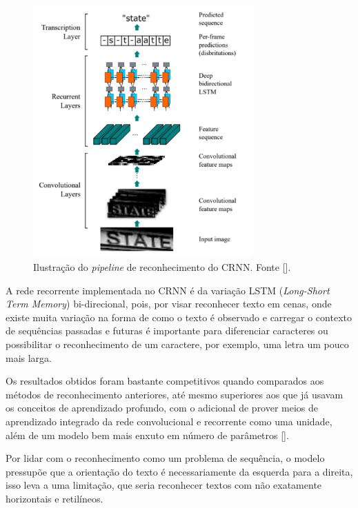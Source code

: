 \begin{figure}
    \centering
    \includegraphics[width=0.75\textwidth]{figs/crnn-pipeline.png}
    \caption{Ilustração do \textit{pipeline} de reconhecimento do CRNN. Fonte [].}
    \label{fig:crnn_pipeline}
\end{figure}

A rede recorrente implementada no CRNN é da variação LSTM (\textit{Long-Short Term Memory}) bi-direcional, pois, por visar reconhecer texto em cenas, 
onde existe muita variação na forma de como o texto é observado e carregar o contexto de sequências passadas e futuras é importante para diferenciar 
caracteres ou possibilitar o reconhecimento de um caractere, por exemplo, uma letra um pouco mais larga.

Os resultados obtidos foram bastante competitivos quando comparados aos métodos de reconhecimento anteriores, até mesmo superiores aos que já usavam 
os conceitos de aprendizado profundo, com o adicional de prover meios de aprendizado integrado da rede convolucional e recorrente como uma unidade, 
além de um modelo bem mais enxuto em número de parâmetros [].

Por lidar com o reconhecimento como um problema de sequência, o modelo pressupõe que a orientação do texto é necessariamente da esquerda para a direita, 
isso leva a uma limitação, que seria reconhecer textos com não exatamente horizontais e retilíneos.

